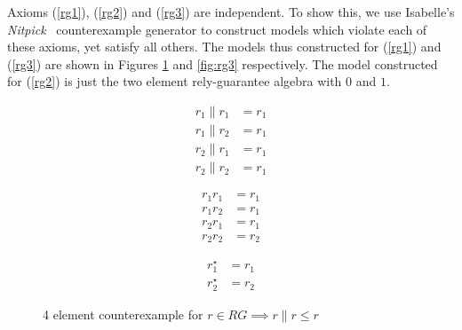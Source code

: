 \documentclass{llncs}
\begin{document}
Axioms (\ref{rg1}), (\ref{rg2}) and (\ref{rg3}) are independent. To
show this, we use Isabelle's
\emph{Nitpick}~\cite{blanchette_nitpick:_2010} counterexample generator
to construct models which violate each of these axioms, yet satisfy
all others. The models thus constructed for (\ref{rg1}) and
(\ref{rg3}) are shown in Figures \ref{fig:rg1} and \ref{fig:rg3}
respectively. The model constructed for (\ref{rg2}) is just the two
element rely-guarantee algebra with $0$ and $1$.

\begin{figure}[H]
\centering
\begin{minipage}{0.24\textwidth}
\end{minipage}
\begin{minipage}{0.24\textwidth}
\begin{align*}
r_1 \| r_1 &= r_1\\
r_1 \| r_2 &= r_1\\
r_2 \| r_1 &= r_1\\
r_2 \| r_2 &= r_1
\end{align*}
\end{minipage}
\begin{minipage}{0.24\textwidth}
\begin{align*}
r_1r_1 &= r_1\\
r_1r_2 &= r_1\\
r_2r_1 &= r_1\\
r_2r_2 &= r_2
\end{align*}
\end{minipage}
\begin{minipage}{0.24\textwidth}
\begin{align*}
r_1^\star &= r_1\\
r_2^\star &= r_2
\end{align*}
\end{minipage}
\caption{4 element counterexample for $r \in RG \implies r\|r \le r$}
\label{fig:rg1}
\end{figure}
\end{document}

